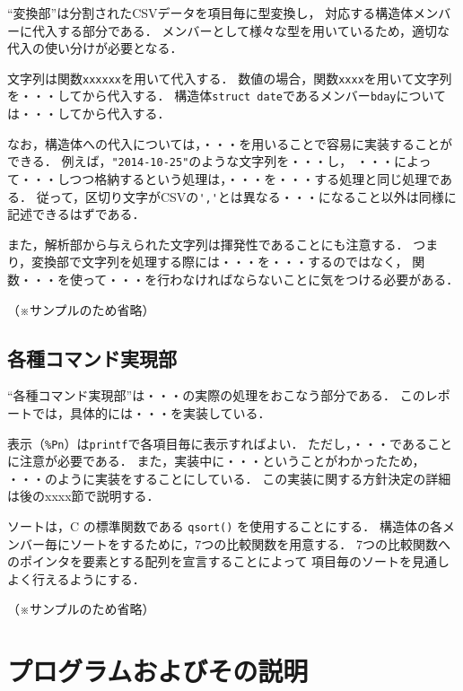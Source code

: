 \documentclass[a4j,11pt]{jarticle}
\begin{document}
``変換部''は分割されたCSVデータを項目毎に型変換し，
対応する構造体メンバーに代入する部分である．
メンバーとして様々な型を用いているため，適切な代入の使い分けが必要となる．

文字列は関数\verb|xxxxxx|を用いて代入する．
数値の場合，関数\verb|xxxx|を用いて文字列を・・・してから代入する．
構造体\verb|struct date|であるメンバー\verb|bday|については・・・してから代入する．

なお，構造体への代入については，・・・を用いることで容易に実装することができる．
例えば，\verb|"2014-10-25"|のような文字列を・・・し，
・・・によって・・・しつつ格納するという処理は，・・・を・・・する処理と同じ処理である．
従って，区切り文字がCSVの\verb|','|とは異なる・・・になること以外は同様に記述できるはずである．

また，解析部から与えられた文字列は揮発性であることにも注意する．
つまり，変換部で文字列を処理する際には・・・を・・・するのではなく，
関数・・・を使って・・・を行わなければならないことに気をつける必要がある．

（※サンプルのため省略）

\subsection{各種コマンド実現部} \label{sec:command}

``各種コマンド実現部''は・・・の実際の処理をおこなう部分である．
このレポートでは，具体的には・・・を実装している．

表示（\verb|%Pn|）は\verb|printf|で各項目毎に表示すればよい．
ただし，・・・であることに注意が必要である．
また，実装中に・・・ということがわかったため，
・・・のように実装をすることにしている．
この実装に関する方針決定の詳細は後のxxxx節で説明する．

ソートは，C の標準関数である \verb|qsort()| を使用することにする．
構造体の各メンバー毎にソートをするために，7つの比較関数を用意する．
7つの比較関数へのポインタを要素とする配列を宣言することによって
項目毎のソートを見通しよく行えるようにする．

（※サンプルのため省略）

\section{プログラムおよびその説明}
\end{document}
